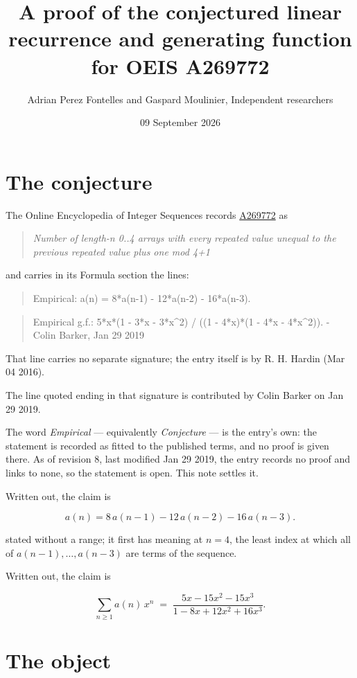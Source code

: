 \documentclass[11pt]{article}
\title{A proof of the conjectured linear recurrence and generating function for OEIS A269772}
\author{Adrian Perez Fontelles and Gaspard Moulinier, Independent researchers}
\date{09 September 2026}
\theoremstyle{definition}
\begin{document}
\maketitle
\section{The conjecture}

The Online Encyclopedia of Integer Sequences records \href{https://oeis.org/A269772}{A269772} as

\begin{quote}\itshape Number of length-n 0..4 arrays with every repeated value unequal to the previous repeated value plus one mod 4+1\end{quote}

and carries in its Formula section the lines:

\begin{quote}\ttfamily Empirical: a(n) = 8*a(n-1) - 12*a(n-2) - 16*a(n-3).\end{quote}

\begin{quote}\ttfamily Empirical g.f.: 5*x*(1 - 3*x - 3*x\textasciicircum{}2) / ((1 - 4*x)*(1 - 4*x - 4*x\textasciicircum{}2)). - Colin Barker, Jan 29 2019\end{quote}

That line carries no separate signature; the entry itself is by R. H. Hardin (Mar 04 2016).

The line quoted ending in that signature is contributed by Colin Barker on Jan 29 2019.

The word {\itshape Empirical} --- equivalently {\itshape Conjecture} --- is the entry's own: the statement is recorded as fitted to the published terms, and no proof is given there. As of revision 8, last modified Jan 29 2019, the entry records no proof and links to none, so the statement is open. This note settles it.

Written out, the claim is

\[a(n) = 8\,a(n-1) - 12\,a(n-2) - 16\,a(n-3).\]

stated without a range; it first has meaning at $n = 4$, the least index at which all of $a(n-1),\dots,a(n-3)$ are terms of the sequence.

Written out, the claim is

\[\sum_{n \ge 1} a(n)\,x^n \;=\; \frac{5x - 15x^{2} - 15x^{3}}{1 - 8x + 12x^{2} + 16x^{3}}.\]

\section{The object}
\end{document}
